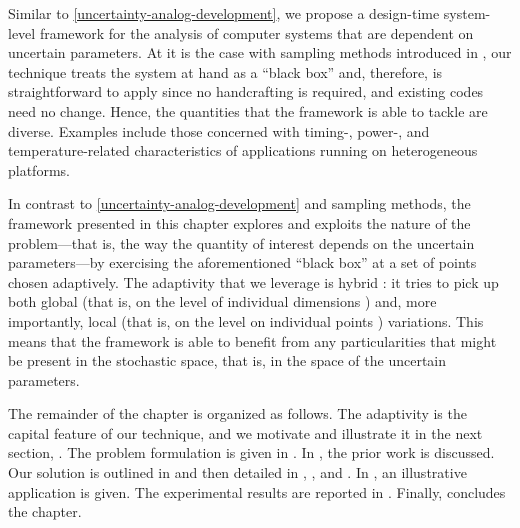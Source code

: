 Similar to \cref{uncertainty-analog-development}, we propose a design-time
system-level framework for the analysis of computer systems that are dependent
on uncertain parameters. At it is the case with sampling methods introduced in
, our technique treats the system at hand as a ``black box'' and,
therefore, is straightforward to apply since no handcrafting is required, and
existing codes need no change. Hence, the quantities that the framework is able
to tackle are diverse. Examples include those concerned with timing-, power-,
and temperature-related characteristics of applications running on heterogeneous
platforms.

In contrast to \cref{uncertainty-analog-development} and sampling methods, the
framework presented in this chapter explores and exploits the nature of the
problem---that is, the way the quantity of interest depends on the uncertain
parameters---by exercising the aforementioned ``black box'' at a set of points
chosen adaptively. The adaptivity that we leverage is hybrid \cite{jakeman2012}:
it tries to pick up both global (that is, on the level of individual dimensions
\cite{klimke2006}) and, more importantly, local (that is, on the level on
individual points \cite{ma2009}) variations. This means that the framework is
able to benefit from any particularities that might be present in the stochastic
space, that is, in the space of the uncertain parameters.

The remainder of the chapter is organized as follows. The adaptivity is the
capital feature of our technique, and we motivate and illustrate it in the next
section, . The problem formulation is given in
. In , the prior work is
discussed. Our solution is outlined in  and then
detailed in , ,
and . In , an
illustrative application is given. The experimental results are reported in
. Finally,  concludes the
chapter.
